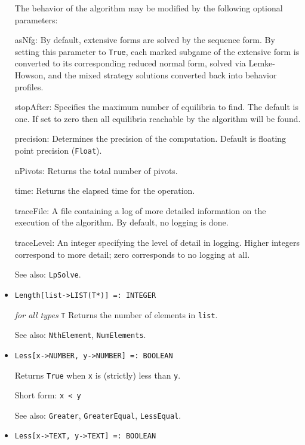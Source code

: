 \begin{itemize}
The behavior of the algorithm may be modified by the following
optional parameters:
\bd
\item
[asNfg:] By default, extensive forms are solved by the sequence form.
By setting this parameter to \verb+True+, each marked subgame of the extensive
form is converted to its corresponding reduced normal form, solved
via Lemke-Howson, and the mixed strategy solutions converted back into
behavior profiles.
\item
[stopAfter:] Specifies the maximum number of equilibria to find.  The
default is one. If set to zero then all equilibria reachable by the
algorithm will be found.
\item
[precision:] Determines the precision of the computation. Default is
floating point precision (\verb+Float+). 
\item
[nPivots:] Returns the total number of pivots. 
\item
[time:] Returns the elapsed time for the operation.
\item
[traceFile:] A file containing a log of more detailed information on the
execution of the algorithm.  By default, no logging is done.
\item
[traceLevel:] An integer specifying the level of detail in logging.
Higher integers correspond to more detail; zero corresponds to no
logging at all.
\ed
\item [See also:] \verb+LpSolve+.
\ed

\item{}
\protect \large \begin{verbatim}
Length[list->LIST(T*)] =: INTEGER
\end{verbatim}\normalsize

{\it for all types} {\tt T}
\bd
Returns the number of elements in \verb+list+.
\item
[See also:] \verb+NthElement+, \verb+NumElements+.
\ed

\item{}
\protect \large \begin{verbatim}
Less[x->NUMBER, y->NUMBER] =: BOOLEAN 
\end{verbatim}\normalsize

\bd
Returns \verb+True+ when \verb+x+ is (strictly) less than \verb+y+.
\item [Short form:] \verb+x < y+
\item [See also:] \verb+Greater+, \verb+GreaterEqual+, \verb+LessEqual+.
\ed

\item{}
\protect \large \begin{verbatim}
Less[x->TEXT, y->TEXT] =: BOOLEAN 
\end{verbatim}\normalsize


\end{itemize}
